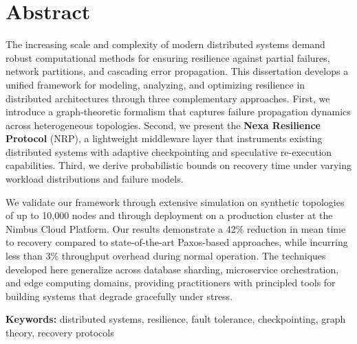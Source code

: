 \chapter*{Abstract}

The increasing scale and complexity of modern distributed systems demand robust computational methods for ensuring resilience against partial failures, network partitions, and cascading error propagation. This dissertation develops a unified framework for modeling, analyzing, and optimizing resilience in distributed architectures through three complementary approaches. First, we introduce a graph-theoretic formalism that captures failure propagation dynamics across heterogeneous topologies. Second, we present the \textbf{Nexa Resilience Protocol} (NRP), a lightweight middleware layer that instruments existing distributed systems with adaptive checkpointing and speculative re-execution capabilities. Third, we derive probabilistic bounds on recovery time under varying workload distributions and failure models.

We validate our framework through extensive simulation on synthetic topologies of up to 10,000 nodes and through deployment on a production cluster at the Nimbus Cloud Platform. Our results demonstrate a 42\% reduction in mean time to recovery compared to state-of-the-art Paxos-based approaches, while incurring less than 3\% throughput overhead during normal operation. The techniques developed here generalize across database sharding, microservice orchestration, and edge computing domains, providing practitioners with principled tools for building systems that degrade gracefully under stress.

\vspace{20pt}
\noindent\textbf{Keywords:} distributed systems, resilience, fault tolerance, checkpointing, graph theory, recovery protocols

